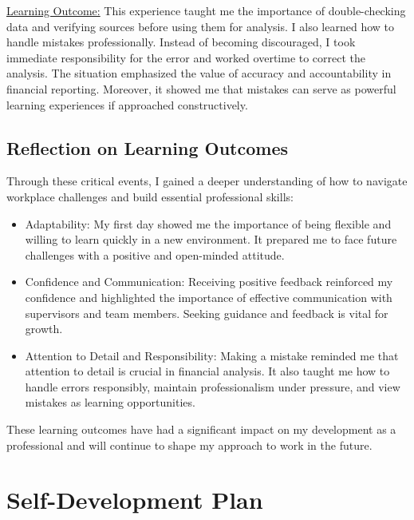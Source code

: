 \documentclass{article}
\begin{document}
\begin{titlepage}
\begin{titlepage}
\begin{flushleft}
\begin{flushleft}
\underline{Learning Outcome:}
This experience taught me the importance of double-checking data and verifying sources before using them for analysis. I also learned how to handle mistakes professionally. Instead of becoming discouraged, I took immediate responsibility for the error and worked overtime to correct the analysis. The situation emphasized the value of accuracy and accountability in financial reporting. Moreover, it showed me that mistakes can serve as powerful learning experiences if approached constructively.
\vspace{0.5cm}

\subsection{\textbf{\Large{Reflection on Learning Outcomes}}}
\vspace{0.15cm}

Through these critical events, I gained a deeper understanding of how to navigate workplace challenges and build essential professional skills:
\begin{itemize}
    \item 

Adaptability: My first day showed me the importance of being flexible and willing to learn quickly in a new environment. It prepared me to face future challenges with a positive and open-minded attitude.
\item 
Confidence and Communication: Receiving positive feedback reinforced my confidence and highlighted the importance of effective communication with supervisors and team members. Seeking guidance and feedback is vital for growth.
\item
Attention to Detail and Responsibility: Making a mistake reminded me that attention to detail is crucial in financial analysis. It also taught me how to handle errors responsibly, maintain professionalism under pressure, and view mistakes as learning opportunities.
\end{itemize}
These learning outcomes have had a significant impact on my development as a professional and will continue to shape my approach to work in the future.
\vspace{0.7cm}

\newpage
\section{\textbf{\huge{Self-Development Plan}}}
\vspace{0.2cm}


\end{flushleft}
\end{flushleft}
\end{titlepage}
\end{titlepage}
\end{document}
